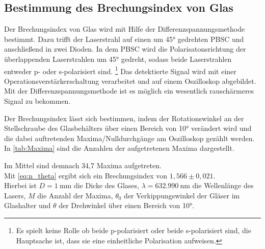 \subsection{Bestimmung des Brechungsindex von Glas}
Der Brechungsindex von Glas wird mit Hilfe der Differenzspannungsmethode bestimmt.
Dazu trifft der Laserstrahl auf einen um 45° gedrehten PBSC und anschließend in zwei Dioden.
In dem PBSC wird die Polarisatonsrichtung der überlappenden Laserstrahlen um 45° gedreht, sodass
beide Laserstrahlen entweder p- oder s-polarisiert sind.
\footnote{Es spielt keine Rolle ob beide p-polarisiert oder beide s-polarisiert sind, die Hauptsache ist, dass sie eine 
einheitliche Polarisation aufweisen.}
Das detektierte Signal wird mit einer Operationsverstärkerschaltung verarbeitet und auf einem
Oszilloskop abgebildet.
Mit der Differenzspannungsmethode ist es möglich ein wesentlich rauschärmeres Signal zu bekommen.

Der Brechungsindex lässt sich bestimmen, indem der Rotationswinkel an der Stellschraube des Glasbehälters %
über einen Bereich von 10° verändert wird und die dabei auftretenden Maxima/Nulldurchgänge am
Oszilloskop gezählt werden.
In \autoref{tab:Maxima} sind die Anzahlen der aufgetretenen Maxima dargestellt.

\FloatBarrier
Im Mittel sind demnach 34,7 Maxima aufgetreten.\\
Mit \autoref{eq:n_theta}
ergibt sich ein Brechungsindex von $1,566 \pm 0,021$.\\
Hierbei ist $D=\SI{1}{\milli\meter}$ die Dicke des Glases, $\lambda=\SI{632,990}{\nano\meter}$ die 
Wellenlänge des Lasers, $M$ die Anzahl der Maxima, $\theta_0$ der Verkippungswinkel der Gläser im Glashalter und
$\theta$ der Drehwinkel über einen Bereich von 10°.

